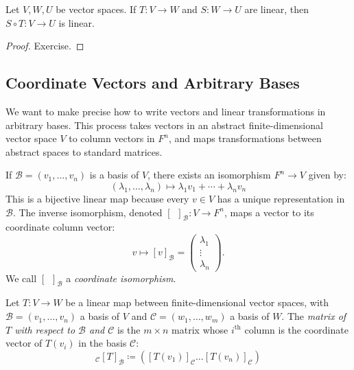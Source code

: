 \documentclass[../linear_algebra_and_groups.tex]{subfiles}
\begin{document}
\begin{proposition}
\label{prop:complinear}
    \begin{shaded*}
        Let $V,W,U$ be vector spaces. If $T:V\to W$ and $S:W\to U$ are linear, then $S\circ T:V\to U$ is linear.
    \end{shaded*}
\end{proposition}
\begin{proof}
    Exercise.\qedhere
\end{proof}

\subsection{Coordinate Vectors and Arbitrary Bases}

We want to make precise how to write vectors and linear transformations in arbitrary bases. This process takes vectors in an abstract finite-dimensional vector space $V$ to column vectors in $F^n$, and maps transformations between abstract spaces to standard matrices.

If $\mathcal{B}=(v_1,\dots,v_n)$ is a basis of $V$, there exists an isomorphism $F^n\to V$ given by:
\[ (\lambda_1,\dots,\lambda_n) \mapsto \lambda_1 v_1+\cdots+\lambda_n v_n \]
This is a bijective linear map because every $v\in V$ has a unique representation in $\mathcal{B}$. The inverse isomorphism, denoted $[\phantom{v}]_\mathcal{B}:V\to F^n$, maps a vector to its coordinate column vector:
\[ v \mapsto [v]_\mathcal{B} = \begin{pmatrix} \lambda_1 \\ \vdots \\ \lambda_n \end{pmatrix}. \]
We call $[\phantom{v}]_\mathcal{B}$ a \textit{coordinate isomorphism}.

\begin{definition}
    \begin{shaded*}
        Let $T:V\to W$ be a linear map between finite-dimensional vector spaces, with $\mathcal{B}=(v_1,\dots,v_n)$ a basis of $V$ and $\mathcal{C}=(w_1,\dots,w_m)$ a basis of $W$. The \textit{matrix of $T$ with respect to $\mathcal{B}$ and $\mathcal{C}$} is the $m \times n$ matrix whose $i^{\mathrm{th}}$ column is the coordinate vector of $T(v_i)$ in the basis $\mathcal{C}$:
        \[ {}_{\mathcal{C}}[T]_{\mathcal{B}} \coloneqq \left( [T(v_1)]_\mathcal{C} \dots [T(v_n)]_\mathcal{C} \right) \]
    \end{shaded*}
\end{definition}
\end{document}

